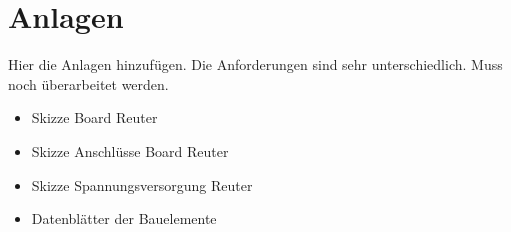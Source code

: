 \appendix%
\chapter*{Anlagen}%
\label{chap: anhang}%
Hier die Anlagen hinzufügen. Die Anforderungen sind sehr unterschiedlich. Muss noch überarbeitet werden.

\begin{itemize}
\item Skizze Board Reuter
\item Skizze Anschlüsse Board Reuter
\item Skizze Spannungsversorgung Reuter
\item Datenblätter der Bauelemente
\end{itemize}
